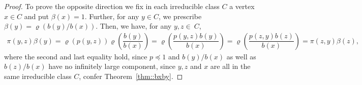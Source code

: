 \documentclass[10pt,a4paper]{amsart}
\newcommand{\map}{\varrho}
\newcommand{\prob}{\pi}
\newcommand{\rw}{\beta}
\begin{document}
\begin{proof}
To prove the opposite direction we fix in each  irreducible class $C$ a vertex $x\in C$ and put
 $\rw(x)=1.
$
Further, for any $y\in C$, we prescribe $\rw(y)=\map({b(y)}/{b(x)})$. Then, we have, for any $y,z\in~C$,
\begin{align*}
\prob(y,z) \rw(y)=\map(p(y,z))\map\left(\dfrac{b(y)}{b(x)}\right)=\map\left(\dfrac{p(y,z) b(y)}{b(x)}\right)=\map\left(\dfrac{p(z,y) b(z)}{b(x)}\right)=\prob(z,y) \rw(z),
\end{align*}
where the second and last equality hold, since $p\preceq 1$ and ${b(y)}/{b(x)}$ as well as ${b(z)}/{b(x)}$  have no infinitely large component, since $y,z$  and $ x$ are all in the same irreducible class  $C$, confer Theorem~\ref{thm::bxby}.
\end{proof}
\end{document}
